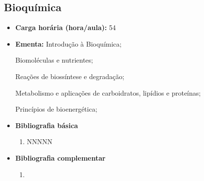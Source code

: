 \documentclass[11pt,fleqn]{book} %
\begin{document}
\subsection{Bioquímica}\label{disc:bioquimica}
\begin{itemize}
	\item \textbf{Carga horária (hora/aula):} 54
	\item \textbf{Ementa:}
	Introdução à Bioquímica; 
	
	Biomoléculas e nutrientes;
	
	Reações de biossíntese e degradação;
	
	Metabolismo e aplicações de carboidratos, lipídios e proteínas;
	
	Princípios de bioenergética;

	\item \textbf{Bibliografia básica}
	\begin{enumerate}
		\item NNNNN
	\end{enumerate}
	\item \textbf{Bibliografia complementar}
	\begin{enumerate}
		\item 
	\end{enumerate}	
\end{itemize}


\newpage
\end{document}

